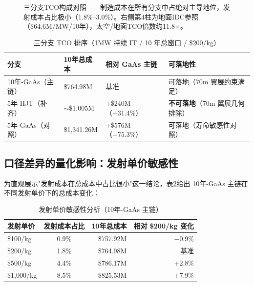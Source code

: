 \begin{figure}[H]
\centering

\caption{三分支TCO构成对照——制造成本在所有分支中占绝对主导地位，发射成本占比极小（1.8\%--3.0\%）。右侧第4柱为地面IDC参照（\~\$64.6M/MW/10年），太空/地面TCO倍数约11.8$\times$。}
\label{fig:tco_branches}
\end{figure}

\begin{table}[H]
\centering
\caption{三分支 TCO 排序（1\;MW 持续 IT / 10 年总窗口 / \$200/kg）}
\label{tab:tco_ranking}
\begin{tabularx}{\textwidth}{
  >{\raggedright\arraybackslash}p{2.9cm}
  >{\centering\arraybackslash}p{2.3cm}
  >{\centering\arraybackslash}p{2.7cm}
  >{\raggedright\arraybackslash}X
}
\toprule
\textbf{分支} & \textbf{10年总成本} & \textbf{相对 GaAs 主链} & \textbf{可落地性} \\
\midrule
10年-GaAs（主链） & \$764.98M   & 基准              & 可落地（70\;m 翼展约束满足） \\
5年-HJT（补齐）   & $\sim$\$1,005M & +\$240M（+31.4\%）  & \textbf{不可落地}（70\;m 翼展几何排除） \\
5年-GaAs（对照）  & \$1,341.26M & +\$576M（+75.3\%）  & 可落地（寿命敏感性对照） \\
\bottomrule
\end{tabularx}
\end{table}

\subsection{口径差异的量化影响：发射单价敏感性}

为直观展示"发射成本在总成本中占比很小"这一结论，表\ref{tab:launch_sensitivity}给出 10年-GaAs 主链在不同发射单价下的总成本变化：

\begin{table}[H]
\centering
\caption{发射单价敏感性分析（10年-GaAs 主链）}
\label{tab:launch_sensitivity}
\begin{tabular}{lcrr}
\toprule
\textbf{发射单价} & \textbf{发射成本占比} & \textbf{10年总成本} & \textbf{相对 \$200/kg 变化} \\
\midrule
\$100/kg  & 0.9\%  & \$757.92M & $-$0.9\% \\
\$200/kg  & 1.8\%  & \$764.98M & 基准 \\
\$500/kg  & 4.4\%  & \$786.17M & +2.8\% \\
\$1,000/kg & 8.5\% & \$825.53M & +7.9\% \\
\bottomrule
\end{tabular}
\end{table}

